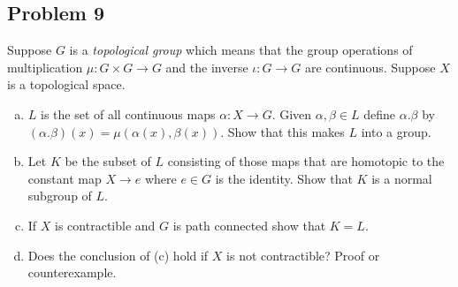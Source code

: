 \documentclass[12pt]{article}
\newcommand{\ita}[1]{\textit{#1}}
\newcommand\paren[1]{\left( #1 \right)}
\theoremstyle{definition}
\begin{document}
\subsection{Problem 9}
Suppose $G$ is a \ita{topological group} which means that the group operations of multiplication $\mu : G \times G \to G$ and the inverse $\iota : G \to G$ are continuous. Suppose $X$ is a topological space.
\begin{enumerate}[(a)]
    \item $L$ is the set of all continuous maps $\alpha : X \to G$. Given $\alpha , \beta \in L$ define $\alpha . \beta$ by $(\alpha.\beta)(x) = \mu \paren{ \alpha(x) , \beta(x) }$. Show that this makes $L$ into a group.
    \item Let $K$ be the subset of $L$ consisting of those maps that are homotopic to the constant map $X \to e$ where $e \in G$ is the identity. Show that $K$ is a normal subgroup of $L$.
    \item If $X$ is contractible and $G$ is path connected show that $K = L$.
    \item Does the conclusion of (c) hold if $X$ is not contractible? Proof or counterexample.
\end{enumerate}
\end{document}
